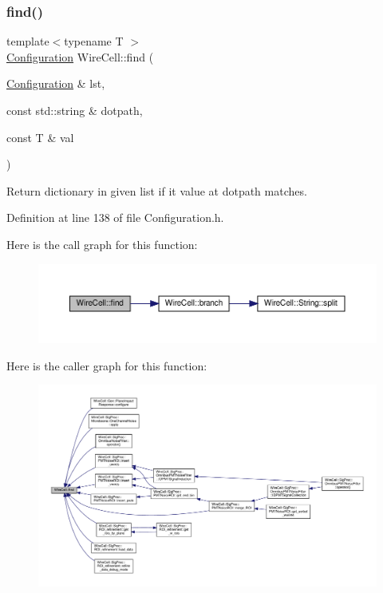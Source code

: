 \subsubsection{\texorpdfstring{find()}{find()}}
{\footnotesize\ttfamily template$<$typename T $>$ \\
\hyperlink{namespace_wire_cell_a9f705541fc1d46c608b3d32c182333ee}{Configuration} Wire\+Cell\+::find (\begin{DoxyParamCaption}\item[{\hyperlink{namespace_wire_cell_a9f705541fc1d46c608b3d32c182333ee}{Configuration} \&}]{lst,  }\item[{const std\+::string \&}]{dotpath,  }\item[{const T \&}]{val }\end{DoxyParamCaption})}



Return dictionary in given list if it value at dotpath matches. 



Definition at line 138 of file Configuration.\+h.

Here is the call graph for this function\+:
\nopagebreak
\begin{figure}[H]
\begin{center}
\leavevmode
\includegraphics[width=350pt]{namespace_wire_cell_aeda39bc129b6bab40d0e35ffb4af55ef_cgraph}
\end{center}
\end{figure}
Here is the caller graph for this function\+:
\nopagebreak
\begin{figure}[H]
\begin{center}
\leavevmode
\includegraphics[width=350pt]{namespace_wire_cell_aeda39bc129b6bab40d0e35ffb4af55ef_icgraph}
\end{center}
\end{figure}
\mbox{\label{namespace_wire_cell_addd60cc21dab98058698afa8222239bc}} 
